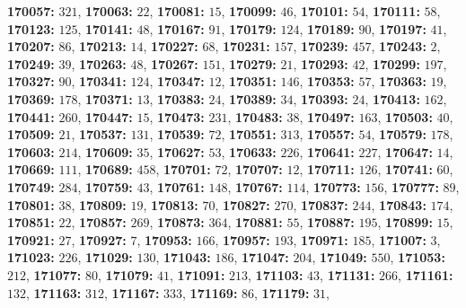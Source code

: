 \textsf{\bfseries 170057:} $321$, \textsf{\bfseries 170063:} $22$, \textsf{\bfseries 170081:} $15$, \textsf{\bfseries 170099:} $46$, \textsf{\bfseries 170101:} $54$, \textsf{\bfseries 170111:} $58$, \textsf{\bfseries 170123:} $125$, \textsf{\bfseries 170141:} $48$, \textsf{\bfseries 170167:} $91$, \textsf{\bfseries 170179:} $124$, \textsf{\bfseries 170189:} $90$, \textsf{\bfseries 170197:} $41$, \textsf{\bfseries 170207:} $86$, \textsf{\bfseries 170213:} $14$, \textsf{\bfseries 170227:} $68$, \textsf{\bfseries 170231:} $157$, \textsf{\bfseries 170239:} $457$, \textsf{\bfseries 170243:} $2$, \textsf{\bfseries 170249:} $39$, \textsf{\bfseries 170263:} $48$, \textsf{\bfseries 170267:} $151$, \textsf{\bfseries 170279:} $21$, \textsf{\bfseries 170293:} $42$, \textsf{\bfseries 170299:} $197$, \textsf{\bfseries 170327:} $90$, \textsf{\bfseries 170341:} $124$, \textsf{\bfseries 170347:} $12$, \textsf{\bfseries 170351:} $146$, \textsf{\bfseries 170353:} $57$, \textsf{\bfseries 170363:} $19$, \textsf{\bfseries 170369:} $178$, \textsf{\bfseries 170371:} $13$, \textsf{\bfseries 170383:} $24$, \textsf{\bfseries 170389:} $34$, \textsf{\bfseries 170393:} $24$, \textsf{\bfseries 170413:} $162$, \textsf{\bfseries 170441:} $260$, \textsf{\bfseries 170447:} $15$, \textsf{\bfseries 170473:} $231$, \textsf{\bfseries 170483:} $38$, \textsf{\bfseries 170497:} $163$, \textsf{\bfseries 170503:} $40$, \textsf{\bfseries 170509:} $21$, \textsf{\bfseries 170537:} $131$, \textsf{\bfseries 170539:} $72$, \textsf{\bfseries 170551:} $313$, \textsf{\bfseries 170557:} $54$, \textsf{\bfseries 170579:} $178$, \textsf{\bfseries 170603:} $214$, \textsf{\bfseries 170609:} $35$, \textsf{\bfseries 170627:} $53$, \textsf{\bfseries 170633:} $226$, \textsf{\bfseries 170641:} $227$, \textsf{\bfseries 170647:} $14$, \textsf{\bfseries 170669:} $111$, \textsf{\bfseries 170689:} $458$, \textsf{\bfseries 170701:} $72$, \textsf{\bfseries 170707:} $12$, \textsf{\bfseries 170711:} $126$, \textsf{\bfseries 170741:} $60$, \textsf{\bfseries 170749:} $284$, \textsf{\bfseries 170759:} $43$, \textsf{\bfseries 170761:} $148$, \textsf{\bfseries 170767:} $114$, \textsf{\bfseries 170773:} $156$, \textsf{\bfseries 170777:} $89$, \textsf{\bfseries 170801:} $38$, \textsf{\bfseries 170809:} $19$, \textsf{\bfseries 170813:} $70$, \textsf{\bfseries 170827:} $270$, \textsf{\bfseries 170837:} $244$, \textsf{\bfseries 170843:} $174$, \textsf{\bfseries 170851:} $22$, \textsf{\bfseries 170857:} $269$, \textsf{\bfseries 170873:} $364$, \textsf{\bfseries 170881:} $55$, \textsf{\bfseries 170887:} $195$, \textsf{\bfseries 170899:} $15$, \textsf{\bfseries 170921:} $27$, \textsf{\bfseries 170927:} $7$, \textsf{\bfseries 170953:} $166$, \textsf{\bfseries 170957:} $193$, \textsf{\bfseries 170971:} $185$, \textsf{\bfseries 171007:} $3$, \textsf{\bfseries 171023:} $226$, \textsf{\bfseries 171029:} $130$, \textsf{\bfseries 171043:} $186$, \textsf{\bfseries 171047:} $204$, \textsf{\bfseries 171049:} $550$, \textsf{\bfseries 171053:} $212$, \textsf{\bfseries 171077:} $80$, \textsf{\bfseries 171079:} $41$, \textsf{\bfseries 171091:} $213$, \textsf{\bfseries 171103:} $43$, \textsf{\bfseries 171131:} $266$, \textsf{\bfseries 171161:} $132$, \textsf{\bfseries 171163:} $312$, \textsf{\bfseries 171167:} $333$, \textsf{\bfseries 171169:} $86$, \textsf{\bfseries 171179:} $31$, 
